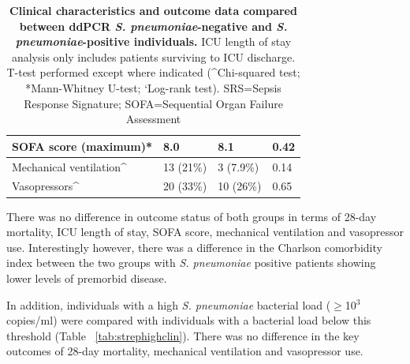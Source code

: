 \begin{table}[]
\begin{center}
\begin{tabular}{|l|l|l|l|}
SOFA score (maximum)*                                                 & 8.0                                                                      & 8.1                                                                      & 0.42             \\ \hline
Mechanical ventilation\textasciicircum{}                              & 13 (21\%)                                                                & 3 (7.9\%)                                                                & 0.14             \\ \hline
Vasopressors\textasciicircum{}                                        & 20 (33\%)                                                                & 10 (26\%)                                                                & 0.65             \\ \hline
\end{tabular}
\end{center}
\smallskip
\caption[\textit{S. pneumoniae} positivity and clinical outcomes]{\textbf{Clinical characteristics and outcome data compared between ddPCR \textit{S. pneumoniae}-negative and \textit{S. pneumoniae}-positive individuals.} ICU length of stay analysis only includes patients surviving to ICU discharge. T-test performed except where indicated (\textasciicircum{}Chi-squared test; *Mann-Whitney U-test; `Log-rank test). SRS=Sepsis Response Signature; SOFA=Sequential Organ Failure Assessment} 
\label{tab:strepclin}
\end{table}
\FloatBarrier

There was no difference in outcome status of both groups in terms of 28-day mortality, ICU length of stay, SOFA score, mechanical ventilation and vasopressor use. Interestingly however, there was a difference in the Charlson comorbidity index between the two groups with \textit{S. pneumoniae} positive patients showing lower levels of premorbid disease. 

In addition, individuals with a high \textit{S. pneumoniae} bacterial load ($\geq$10$^3$ copies/ml) were compared with individuals with a bacterial load below this threshold (Table ~\ref{tab:strephighclin}). There was no difference in the key outcomes of 28-day mortality, mechanical ventilation and vasopressor use.

